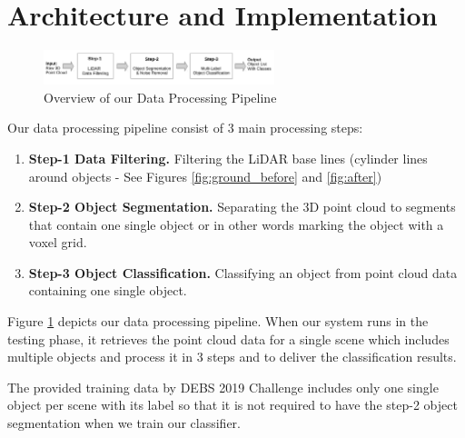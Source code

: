 \section{Architecture and Implementation}\label{sec:Architecture}

\begin{figure}[!ht]
 \begin{center}
   \includegraphics[width=0.6\textwidth]{./images/DataProcessingPipleline.pdf}
   \caption{Overview of our Data Processing Pipeline}
   \label{fig:dataPipeline}
 \end{center}
\end{figure}

Our data processing pipeline consist of 3 main processing steps:

\begin{enumerate}
  \item \textbf{Step-1 Data Filtering. } Filtering the LiDAR base lines (cylinder lines around objects - See Figures \ref{fig:ground_before} and \ref{fig:after})

  \item \textbf{Step-2 Object Segmentation.} Separating the 3D point cloud to segments that contain one single object or in other words marking the object with a voxel grid.

  \item \textbf{Step-3 Object Classification.}  Classifying an object from point cloud data containing one single object.
\end{enumerate}




Figure \ref{fig:dataPipeline} depicts our data processing pipeline. 
When our system runs in the testing phase, it retrieves the point cloud data for a single scene which includes multiple objects and process it in 3 steps and to deliver the classification results.

The provided training data by DEBS 2019 Challenge \cite{DEBSGC2019} includes only one single object per scene 
with its label so that it is not required to have the step-2 object segmentation when we train our classifier.


